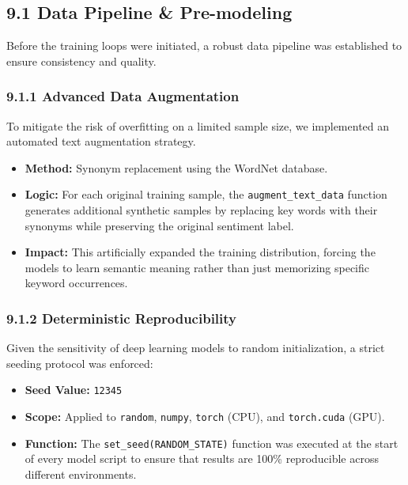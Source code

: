 \documentclass[
]{article}
\providecommand{\tightlist}{%
  \setlength{\itemsep}{0pt}\setlength{\parskip}{0pt}}
\begin{document}
\subsection{9.1 Data Pipeline \&
Pre-modeling}\label{data-pipeline-pre-modeling}

Before the training loops were initiated, a robust data pipeline was
established to ensure consistency and quality.

\subsubsection{9.1.1 Advanced Data
Augmentation}\label{advanced-data-augmentation}

To mitigate the risk of overfitting on a limited sample size, we
implemented an automated text augmentation strategy.

\begin{itemize}
\tightlist
\item
  \textbf{Method:} Synonym replacement using the WordNet database.
\item
  \textbf{Logic:} For each original training sample, the
  \texttt{augment\_text\_data} function generates additional synthetic
  samples by replacing key words with their synonyms while preserving
  the original sentiment label.
\item
  \textbf{Impact:} This artificially expanded the training distribution,
  forcing the models to learn semantic meaning rather than just
  memorizing specific keyword occurrences.
\end{itemize}

\subsubsection{9.1.2 Deterministic
Reproducibility}\label{deterministic-reproducibility}

Given the sensitivity of deep learning models to random initialization,
a strict seeding protocol was enforced:

\begin{itemize}
\tightlist
\item
  \textbf{Seed Value:} \texttt{12345}
\item
  \textbf{Scope:} Applied to \texttt{random}, \texttt{numpy},
  \texttt{torch} (CPU), and \texttt{torch.cuda} (GPU).
\item
  \textbf{Function:} The \texttt{set\_seed(RANDOM\_STATE)} function was
  executed at the start of every model script to ensure that results are
  100\% reproducible across different environments.
\end{itemize}
\end{document}
